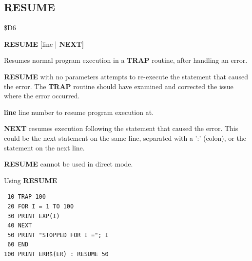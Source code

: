
\newpage
\subsection{RESUME}
\begin{description}[leftmargin=2cm,style=nextline]
\item [Token:]    \$D6

\item [Format:]   {\bf RESUME} [line | {\bf NEXT}]

\item [Usage:]    Resumes normal program execution in a {\bf TRAP} routine, after handling an error.

                  {\bf RESUME} with no parameters attempts to re-execute the statement that caused the error. The {\bf TRAP} routine should have examined and corrected the issue where the error occurred.

                  {\bf line} line number to resume program execution at.

                  {\bf NEXT} resumes execution following the statement that caused the error. This could be the next statement on the same line, separated with a ':' (colon), or the statement on the next line.

\item [Remarks:]  {\bf RESUME} cannot be used in direct mode.

\item [Example:]  Using {\bf RESUME}

\begin{tcolorbox}[colback=black,coltext=white]
\verbatimfont{\codefont}
\begin{verbatim}
 10 TRAP 100
 20 FOR I = 1 TO 100
 30 PRINT EXP(I)
 40 NEXT
 50 PRINT "STOPPED FOR I ="; I
 60 END
100 PRINT ERR$(ER) : RESUME 50
\end{verbatim}
\end{tcolorbox}
\end{description}


\newpage

